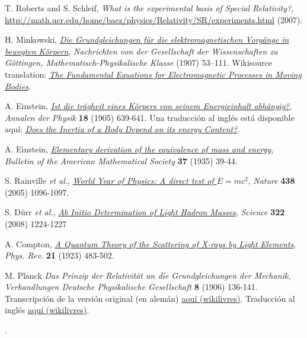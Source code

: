 \begin{thebibliography}{99}
 T. Roberts and S. Schleif, {\it What is the experimental basis of Special Relativity?},  \url{http://math.ucr.edu/home/baez/physics/Relativity/SR/experiments.html} (2007).

 H. Minkowski, \href{http://de.wikisource.org/wiki/Die_Grundgleichungen_f\%C3\%BCr_die_elektromagnetischen_Vorg\%C3\%A4nge_in_bewegten_K\%C3\%B6rpern}{\it Die Grundgleichungen f\"ur die elektromagnetischen Vorgänge in bewegten Körpern}, {\sl Nachrichten von der Gesellschaft der Wissenschaften zu Göttingen, Mathematisch-Physikalische Klasse} (1907) 53–111. Wikisource translation: \href{http://en.wikisource.org/wiki/The_Fundamental_Equations_for_Electromagnetic_Processes_in_Moving_Bodies}{\it The Fundamental Equations for Electromagnetic Processes in Moving Bodies}.

 A. Einstein, \href{https://doi.org/10.1002\%2Fandp.19053231314}{\textit{Ist die trägheit eines Körpers von seinem Energieinhalt abhängig?}}, {\sl Annalen der Physik} {\bf 18} (1905) 639-641. Una traducción al inglés está disponible aquí: \href{{https://www.fourmilab.ch/etexts/einstein/E_mc2/e_mc2.pdf}}{\textit{Does the Inertia of a Body Depend on its energy Content?}}.

 A. Einstein, \href{http://www.ams.org/journals/bull/2000-37-01/S0273-0979-99-00805-8/S0273-0979-99-00805-8.pdf}
{\textit{Elementary derivation of the equivalence of mass and energy}}, {\sl Bulletin of the American Mathematical Society} {\bf 37} (1935) 39-44.

 S. Rainville \textit{et al.}, \href{https://doi.org/10.1038/4381096a}{\it World Year of Physics: A direct test of $E=mc^2$}, {\sl Nature} {\bf 438} (2005) 1096-1097.

 S. Dürr \textit{et al.}, \href{https://doi.org/10.1126/science.1163233}{\it Ab Initio Determination of Light Hadron Masses}, {\sl Science} {\bf 322} (2008) 1224-1227

 A. Compton, \href{http://prola.aps.org/abstract/PR/v21/i5/p483_1}{\it A Quantum Theory of the Scattering of X-rays by Light Elements}, {\sl Phys. Rev.} {\bf 21} (1923) 483-502.

 M. Planck {\it Das Prinzip der Relativität un die Grundgleichungen der Mechanik}, {\sl Verhandlungen Deutsche Physikalische Gesellschaft} {\bf 8} (1906) 136-141. Transcripción de la versión original (en alemán) \href{http://wikilivres.ca/wiki/Das_Prinzip_der_Relativit\%C3\%A4t_und_die_Grundgleichungen_der_Mechanik}{aquí (wikilivres)}. Traducción al inglés  \href{http://en.wikisource.org/wiki/Translation:The_Principle_of_Relativity_and_the_Fundamental_Equations_of_Mechanics}{aquí (wikilivres)}.

\end{thebibliography}.
